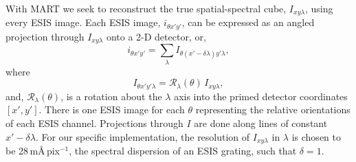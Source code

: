 	
	With MART we seek to reconstruct the true spatial-spectral cube, $I_{xy\lambda}$, using every ESIS image.
	Each ESIS image, $i_{\theta x'y'}$, can be expressed as an angled projection through $I_{xy\lambda}$ onto a 2-D detector, or,
	\begin{equation}
	    i_{\theta x'y'} = \sum_\lambda I_{\theta(x'-\delta\lambda)y'\lambda},
	\end{equation}
	where
	\begin{equation}
		I_{\theta x'y'\lambda} = \mathcal{R}_\lambda(\theta)\,I_{xy\lambda},
	\end{equation} 
	and, $\mathcal{R}_\lambda (\theta)$, is a rotation about the $\lambda$ axis into the primed detector coordinates $[x',y']$.
	There is one ESIS image for each $\theta$ representing the relative orientations of each ESIS channel.
	Projections through $I$ are done along lines of constant $x'-\delta\lambda$.
	For our specific implementation, the resolution of $I_{xy\lambda}$ in $\lambda$ is chosen to be 28\,m\AA\,pix$^{-1}$, the spectral dispersion of an ESIS grating, such that $\delta = 1$. 

